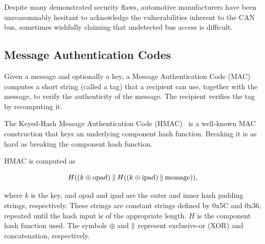 Despite many demonstrated security flaws, automotive 
manufacturers have been unreasomnably hesitant to acknowledge the vulnerabilities inherent to the CAN bus,
sometimes wishfully claiming that undetected bus access is difficult. 


\subsection{Message Authentication Codes}

Given a message and optionally a key, a Message Authentication Code (MAC) computes a short string (called a tag) 
that a recipient can use, together with the message, to verify the authenticity of the message.  The recipient 
verifies the tag by recomputing it.

The Keyed-Hash Message Authentication Code (HMAC)~\cite{HMAC,FIPS-198-1} 
is a well-known MAC construction that keys an underlying component hash function.  
Breaking it is as hard as breaking the component hash function.

HMAC is computed as

\begin{equation}
H((k\oplus \text{opad})\mathbin{\|} H((k\oplus \text{ipad})\mathbin{\|} \text{message})) ,
\end{equation}

\noindent
where $k$ is the key, and opad and ipad are the outer and inner hash padding strings, respectively. 
These strings are constant strings defined by 0x5C and 0x36, repeated until the hash input is of the appropriate length. 
$H$ is the component hash function used. 
The symbols $\oplus$ and $\mathbin{\|}$ represent exclusive-or (XOR) and concatenation, respectively.



